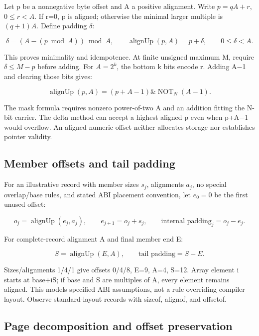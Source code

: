 \hypertarget{03-visual-computing-i-ch018-alignment-rounding-without-hiding-overflow}{}

Let p be a nonnegative byte offset and A a positive alignment. Write \(p=qA+r\), \(0\le r<A\). If r=0, p is aligned; otherwise the minimal larger multiple is \((q+1)A\). Define padding \(\delta\):

\[
\delta=(A-(p\bmod A))\bmod A,\qquad
\operatorname{alignUp}(p,A)=p+\delta,\qquad 0\le\delta<A.
\]

This proves minimality and idempotence. At finite unsigned maximum M, require \(\delta\le M-p\) before adding. For \(A=2^k\), the bottom k bits encode r. Adding A−1 and clearing those bits gives:

\[
\operatorname{alignUp}(p,A)=(p+A-1)\mathbin{\&}\operatorname{NOT}_N(A-1).
\]

The mask formula requires nonzero power-of-two A and an addition fitting the N-bit carrier. The delta method can accept a highest aligned p even when p+A−1 would overflow. An aligned numeric offset neither allocates storage nor establishes pointer validity.

\subsection{Member offsets and tail padding}\label{03-visual-computing-i-ch018-member-offsets-and-tail-padding}

\hypertarget{03-visual-computing-i-ch018-member-offsets-and-tail-padding}{}

For an illustrative record with member sizes \(s_j\), alignments \(a_j\), no special overlap/base rules, and stated ABI placement convention, let \(e_0=0\) be the first unused offset:

\[
o_j=\operatorname{alignUp}(e_j,a_j),\qquad
e_{j+1}=o_j+s_j,\qquad
\text{internal padding}_j=o_j-e_j.
\]

For complete-record alignment A and final member end E:

\[
S=\operatorname{alignUp}(E,A),\qquad
\text{tail padding}=S-E.
\]

Sizes/alignments 1/4/1 give offsets 0/4/8, E=9, A=4, S=12. Array element i starts at base+iS; if base and S are multiples of A, every element remains aligned. This models specified ABI assumptions, not a rule overriding compiler layout. Observe standard-layout records with sizeof, alignof, and offsetof.

\subsection{Page decomposition and offset preservation}\label{03-visual-computing-i-ch018-page-decomposition-and-offset-preservation}

